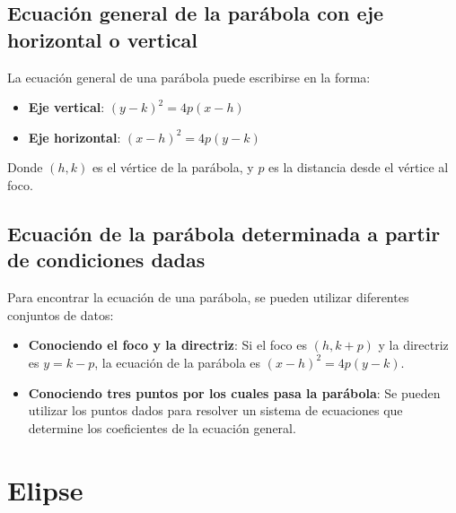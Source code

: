 \subsection{Ecuación general de la parábola con eje horizontal o vertical}
La ecuación general de una parábola puede escribirse en la forma:
\begin{itemize}
    \item \textbf{Eje vertical}: \((y - k)^2 = 4p(x - h)\)
    \item \textbf{Eje horizontal}: \((x - h)^2 = 4p(y - k)\)
\end{itemize}
Donde \((h, k)\) es el vértice de la parábola, y \( p \) es la distancia desde el vértice al foco.

\subsection{Ecuación de la parábola determinada a partir de condiciones dadas}
Para encontrar la ecuación de una parábola, se pueden utilizar diferentes conjuntos de datos:
\begin{itemize}
    \item \textbf{Conociendo el foco y la directriz}: Si el foco es \((h, k + p)\) y la directriz es \(y = k - p\), la ecuación de la parábola es \((x - h)^2 = 4p(y - k)\).
    \item \textbf{Conociendo tres puntos por los cuales pasa la parábola}: Se pueden utilizar los puntos dados para resolver un sistema de ecuaciones que determine los coeficientes de la ecuación general.
\end{itemize}

\begin{center}
\end{center}
\section{Elipse} %

